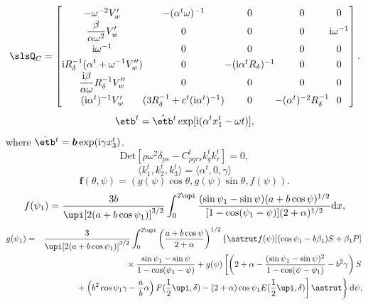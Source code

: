\documentclass[lineno]{JFM-FLM_Au}
\begin{document}
\begin{equation}
\setlength{\arraycolsep}{0pt}
\renewcommand{\arraystretch}{1.3}
\slsQ_C = \left[
\begin{array}{ccccc}
  -\omega^{-2}V'_w  &  -(\alpha^t\omega)^{-1}  &  0  &  0  &  0  \\
  \displaystyle
  \frac{\beta}{\alpha\omega^2}V'_w  &  0  &  0  &  0  &  \mathrm{i}\omega^{-1} \\
  \mathrm{i}\omega^{-1}  &  0  &  0  &  0  &  0  \\
  \displaystyle
  \mathrm{i} R^{-1}_{\delta}(\alpha^t+\omega^{-1}V''_w)  &  0
    & -(\mathrm{i}\alpha^tR_\delta)^{-1}  &  0  &  0  \\
  \displaystyle
  \frac{\mathrm{i}\beta}{\alpha\omega}R^{-1}_\delta V''_w  &  0  &  0
    &  0  & 0 \\
  (\mathrm{i}\alpha^t)^{-1}V'_w  &  (3R^{-1}_{\delta}+c^t(\mathrm{i}\alpha^t)^{-1})
    &  0  &  -(\alpha^t)^{-2}R^{-1}_{\delta}  &  0  \\
\end{array}  \right] .
\label{defQc}
\end{equation}
\begin{equation}
\etb^t = \skew2\hat{\etb}^t \exp [\mathrm{i} (\alpha^tx^t_1-\omega t)],
\end{equation}
where $\skew2\hat{\etb}^t=\boldsymbol{b}\exp (\mathrm{i}\gamma x^t_3)$.
\begin{equation}
\mbox{Det}[\rho\omega^2\delta_{ps}-C^t_{pqrs}k^t_qk^t_r]=0,
\end{equation}
\begin{equation}
 \langle k^t_1,k^t_2,k^t_3\rangle = \langle
\alpha^t,0,\gamma\rangle
\end{equation}
\begin{equation}
\boldsymbol{f}(\theta,\psi) = (g(\psi)\cos \theta,g(\psi) \sin \theta,f(\psi)).
\label{eq41}
\end{equation}
\begin{eqnarray}
f(\psi_1) = \frac{3b}{\upi[2(a+b \cos \psi_1)]^{{3}/{2}}}
  \int^{2\upi}_0 \frac{(\sin \psi_1 - \sin \psi)(a+b \cos \psi)^{1/2}}%
  {[1 - \cos (\psi_1 - \psi)](2+\alpha)^{1/2}}\mathrm{d}x,
\label{eq42}
\end{eqnarray}
\begin{eqnarray}
g(\psi_1) & = & \frac{3}{\upi[2(a+b \cos \psi_1)]^{{3}/{2}}}
  \int^{2\upi}_0 \left(\frac{a+b \cos \psi}{2+\alpha}\right)^{1/2}
  \left\{ \astrut f(\psi)[(\cos \psi_1 - b \beta_1)S + \beta_1P]
  \right. \nonumber\\
&& \mbox{}\times \frac{\sin \psi_1 - \sin \psi}{1-\cos(\psi_1 - \psi)}
  + g(\psi) \left[\left(2+\alpha - \frac{(\sin \psi_1 - \sin \psi)^2}
  {1- \cos (\psi - \psi_1)} - b^2 \gamma \right) S \right.\nonumber\\
&& \left.\left.\mbox{} + \left( b^2 \cos \psi_1\gamma -
  \frac{a}{b}\alpha \right) F(\frac{1}{2}\upi, \delta) - (2+\alpha)
  \cos\psi_1 E(\frac{1}{2}\upi, \delta)\right] \astrut\right\} \mathrm{d} \psi,
\label{eq43}
\end{eqnarray}
\end{document}
